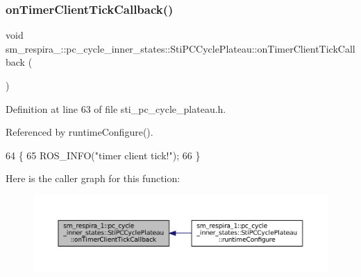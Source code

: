 \subsubsection{\texorpdfstring{on\+Timer\+Client\+Tick\+Callback()}{onTimerClientTickCallback()}}
{\footnotesize\ttfamily void sm\+\_\+respira\+\_\+::pc\+\_\+cycle\+\_\+inner\+\_\+states\+::\+Sti\+P\+C\+Cycle\+Plateau\+::on\+Timer\+Client\+Tick\+Callback (\begin{DoxyParamCaption}{ }\end{DoxyParamCaption})\hspace{0.3cm}{\ttfamily [inline]}}



Definition at line 63 of file sti\+\_\+pc\+\_\+cycle\+\_\+plateau.\+h.



Referenced by runtime\+Configure().


\begin{DoxyCode}
64   \{
65     ROS\_INFO(\textcolor{stringliteral}{"timer client tick!"});
66   \}
\end{DoxyCode}
Here is the caller graph for this function\+:
\nopagebreak
\begin{figure}[H]
\begin{center}
\leavevmode
\includegraphics[width=350pt]{structsm__respira__1_1_1pc__cycle__inner__states_1_1StiPCCyclePlateau_ac06330f07324f60ea5870ac89c75f7c5_icgraph}
\end{center}
\end{figure}
\mbox{\label{structsm__respira__1_1_1pc__cycle__inner__states_1_1StiPCCyclePlateau_a3805f3ea12735bcb40af9c9db7e5ce05}} 
